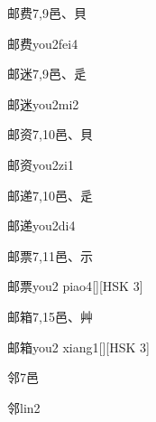 \begin{Entry}{邮费}{7,9}{⾢、⾙}
  \begin{Phonetics}{邮费}{you2fei4}
  \end{Phonetics}
\end{Entry}

\begin{Entry}{邮迷}{7,9}{⾢、⾡}
  \begin{Phonetics}{邮迷}{you2mi2}
  \end{Phonetics}
\end{Entry}

\begin{Entry}{邮资}{7,10}{⾢、⾙}
  \begin{Phonetics}{邮资}{you2zi1}
  \end{Phonetics}
\end{Entry}

\begin{Entry}{邮递}{7,10}{⾢、⾡}
  \begin{Phonetics}{邮递}{you2di4}
  \end{Phonetics}
\end{Entry}

\begin{Entry}{邮票}{7,11}{⾢、⽰}
  \begin{Phonetics}{邮票}{you2 piao4}[][HSK 3]
  \end{Phonetics}
\end{Entry}

\begin{Entry}{邮箱}{7,15}{⾢、⾋}
  \begin{Phonetics}{邮箱}{you2 xiang1}[][HSK 3]
  \end{Phonetics}
\end{Entry}

\begin{Entry}{邻}{7}{⾢}
  \begin{Phonetics}{邻}{lin2}
  \end{Phonetics}
\end{Entry}

